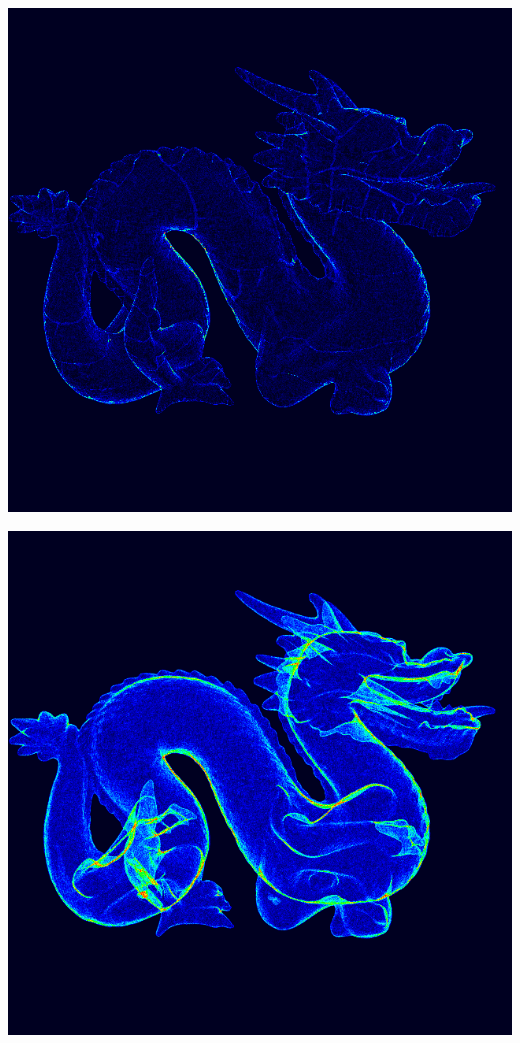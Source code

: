 \begin{center}
\begin{minipage}{0.48\linewidth}
\includegraphics[width=\linewidth]{img/dragon-traversal-ordered.png}
\end{minipage}
\begin{minipage}{0.48\linewidth}
\includegraphics[width=\linewidth]{img/dragon-traversal-unordered.png}
\end{minipage}
\end{center}

